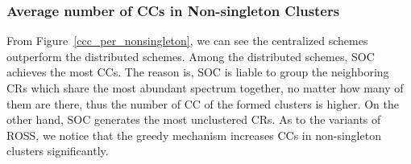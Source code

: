 \documentclass[10pt,journal,compsoc]{IEEEtran}
\theoremstyle{mytheoremstyle}
\theoremstyle{mytheoremstyle}
\theoremstyle{mytheoremstyle}
\begin{document}
\subsubsection{Average number of CCs in Non-singleton Clusters}
\label{ccc_20}
From Figure~\ref{ccc_per_nonsingleton}, we can see the centralized schemes outperform the distributed schemes.
Among the distributed schemes, SOC achieves the most CCs.
The reason is, SOC is liable to group the neighboring CRs which share the most abundant spectrum together, no matter how many of them are there, thus the number of CC of the formed clusters is higher.
On the other hand, SOC generates the most unclustered CRs.
As to the variants of ROSS, we notice that the greedy mechanism increases CCs in non-singleton clusters significantly.

\end{document}
